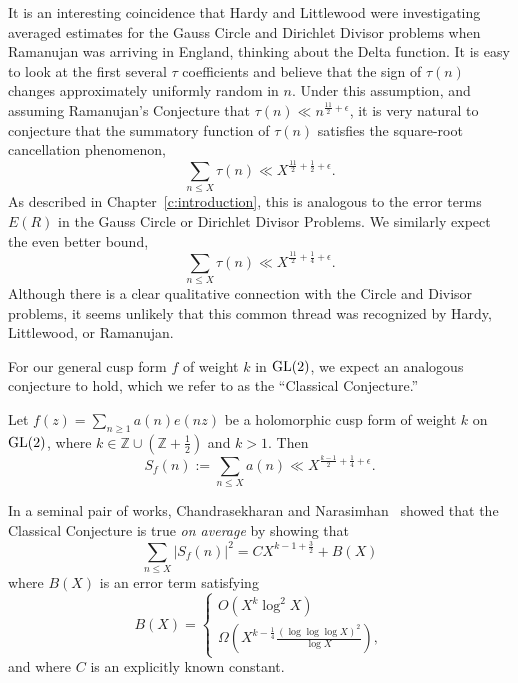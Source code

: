 It is an interesting coincidence that Hardy and Littlewood were investigating averaged
estimates for the Gauss Circle and Dirichlet Divisor problems when Ramanujan was arriving
in England, thinking about the Delta function.
It is easy to look at the first several $\tau$ coefficients and believe that the sign of
$\tau(n)$ changes approximately uniformly random in $n$.
Under this assumption, and assuming Ramanujan's Conjecture that $\tau(n) \ll
n^{\frac{11}{2} + \epsilon}$, it is very natural to conjecture that the summatory function
of $\tau(n)$ satisfies the square-root cancellation phenomenon,
\begin{equation}
  \sum_{n \leq X} \tau(n) \ll X^{\frac{11}{2} + \frac{1}{2} + \epsilon}.
\end{equation}
As described in Chapter~\ref{c:introduction}, this is analogous to the error terms $E(R)$
in the Gauss Circle or Dirichlet Divisor Problems.
We similarly expect the even better bound,
\begin{equation}
  \sum_{n \leq X} \tau(n) \ll X^{\frac{11}{2} + \frac{1}{4} + \epsilon}.
\end{equation}
Although there is a clear qualitative connection with the Circle and Divisor problems, it
seems unlikely that this common thread was recognized by Hardy, Littlewood, or Ramanujan.


For our general cusp form $f$ of weight $k$ in $\operatorname{GL}(2)$, we expect an analogous conjecture
to hold, which we refer to as the ``Classical Conjecture.''


\begin{conjecture}
  Let $f(z) = \sum_{n \geq 1} a(n) e(nz)$ be a holomorphic cusp form of weight $k$ on
  $\operatorname{GL}(2)$, where $k \in \mathbb{Z}\cup(\mathbb{Z}+\frac{1}{2})$ and $k > 1$.
  Then
  \begin{equation}
    S_f(n) := \sum_{n \leq X} a(n) \ll X^{\frac{k-1}{2} + \frac{1}{4} + \epsilon}.
  \end{equation}
\end{conjecture}


In a seminal pair of works, Chandrasekharan and
Narasimhan~\cite{chandrasekharan1962functional, chandrasekharan1964mean} showed that the
Classical Conjecture is true \emph{on average} by showing that
\begin{equation*}
  \sum_{n \leq X} \lvert S_f(n) \rvert^2 = C X^{k-1 + \frac{3}{2}} + B(X)
\end{equation*}
where $B(X)$ is an error term satisfying
\begin{equation}
  B(X) = \begin{cases}
    O(X^k \log^2 X) \\
    \Omega(X^{k - \frac{1}{4}} \frac{(\log \log \log X)^2}{\log X}),
  \end{cases}
\end{equation}
and where $C$ is an explicitly known constant.



